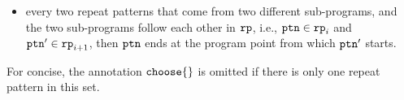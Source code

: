 \begin{lem}
\begin{itemize}
  \item 
  every two repeat patterns that come from two different sub-programs,
  and the two sub-programs follow each other in $\mathtt{rp}$, 
  i.e.,
  $\mathtt{ptn} \in \mathtt{rp}_i$ and $\mathtt{ptn}' \in \mathtt{rp}_{i + 1}$,
  then $\mathtt{ptn}$ ends at the program point from which $\mathtt{ptn}'$ starts.
  \end{itemize}
\end{lem}
%
For concise, the annotation $\rpchoose{}$ is omitted if there is only one repeat pattern in this set.
